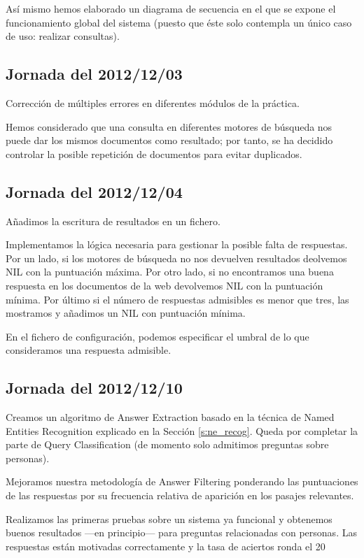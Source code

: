 \documentclass[12pt,a4paper,titlepage]{article}
\begin{document}
Así mismo hemos elaborado un diagrama de secuencia en el que se expone el funcionamiento global del sistema (puesto que éste solo contempla un único caso de uso: realizar consultas).

\subsection{Jornada del 2012/12/03}
Corrección de múltiples errores en diferentes módulos de la práctica.

Hemos considerado que una consulta en diferentes motores de búsqueda nos puede dar los mismos documentos como resultado; por tanto, se ha decidido controlar la posible repetición de documentos para evitar duplicados.

\subsection{Jornada del 2012/12/04}
Añadimos la escritura de resultados en un fichero.

Implementamos la lógica necesaria para gestionar la posible falta de respuestas. Por un lado, si los motores de búsqueda no nos devuelven resultados deolvemos NIL con la puntuación máxima. Por otro lado, si no encontramos una buena respuesta en los documentos de la web devolvemos NIL con la puntuación mínima. Por último si el número de respuestas admisibles es menor que tres, las mostramos y añadimos un NIL con puntuación mínima.

En el fichero de configuración, podemos especificar el umbral de lo que consideramos una respuesta admisible.

\subsection{Jornada del 2012/12/10}
Creamos un algoritmo de Answer Extraction basado en la técnica de Named Entities Recognition explicado en la Sección \ref{s:ne_recog}. Queda por completar la parte de Query Classification (de momento solo admitimos preguntas sobre personas).

Mejoramos nuestra metodología de Answer Filtering ponderando las puntuaciones de las respuestas por su frecuencia relativa de aparición en los pasajes relevantes.

Realizamos las primeras pruebas sobre un sistema ya funcional y obtenemos buenos resultados ---en principio--- para preguntas relacionadas con personas. Las respuestas están motivadas correctamente y la tasa de aciertos ronda el 20\\%
\end{document}
